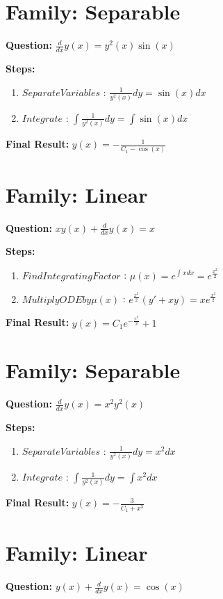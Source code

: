 \documentclass{article}
\begin{document}
\section*{Family: Separable}
\textbf{Question:} $\frac{d}{d x} y{\left(x \right)} = y^{2}{\left(x \right)} \sin{\left(x \right)}$

\textbf{Steps:}
\begin{enumerate}
\item $Separate Variables$ :  $\frac{1}{y^{2}{\left(x \right)}} dy = \sin{\left(x \right)} dx$
\item $Integrate$ :  $\int \frac{1}{y^{2}{\left(x \right)}} dy = \int \sin{\left(x \right)} dx$
\end{enumerate}
\textbf{Final Result:} $y{\left(x \right)} = - \frac{1}{C_{1} - \cos{\left(x \right)}}$

\section*{Family: Linear}
\textbf{Question:} $x y{\left(x \right)} + \frac{d}{d x} y{\left(x \right)} = x$

\textbf{Steps:}
\begin{enumerate}
\item $Find Integrating Factor$ :  $\mu(x) = e^{\int x dx} = e^{\frac{x^{2}}{2}}$
\item $Multiply ODE by \mu(x)$ :  $e^{\frac{x^{2}}{2}}(y' + xy) = x e^{\frac{x^{2}}{2}}$
\end{enumerate}
\textbf{Final Result:} $y{\left(x \right)} = C_{1} e^{- \frac{x^{2}}{2}} + 1$

\section*{Family: Separable}
\textbf{Question:} $\frac{d}{d x} y{\left(x \right)} = x^{2} y^{2}{\left(x \right)}$

\textbf{Steps:}
\begin{enumerate}
\item $Separate Variables$ :  $\frac{1}{y^{2}{\left(x \right)}} dy = x^{2} dx$
\item $Integrate$ :  $\int \frac{1}{y^{2}{\left(x \right)}} dy = \int x^{2} dx$
\end{enumerate}
\textbf{Final Result:} $y{\left(x \right)} = - \frac{3}{C_{1} + x^{3}}$

\section*{Family: Linear}
\textbf{Question:} $y{\left(x \right)} + \frac{d}{d x} y{\left(x \right)} = \cos{\left(x \right)}$
\end{document}
